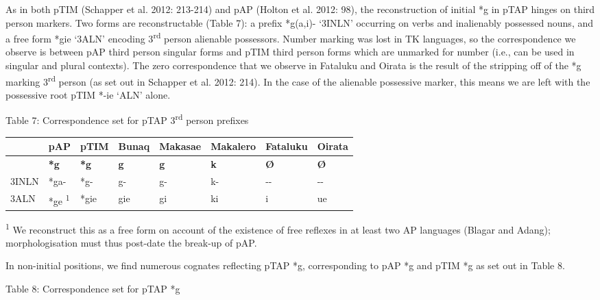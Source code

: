 \documentclass[a4paper]{article}
\begin{document}
As in both pTIM (Schapper et al. 2012: 213-214) and pAP (Holton et al. 2012: 98), the reconstruction of initial *g in pTAP hinges on third person markers. Two forms are reconstructable (Table 7): a prefix *g(a,i)- {\textquoteleft}3INLN{\textquoteright} occurring on verbs and inalienably possessed nouns, and a free form *gie {\textquoteleft}3ALN{\textquoteright} encoding 3\textsuperscript{rd} person alienable possessors. Number marking was lost in TK languages, so the correspondence we observe is between pAP third person singular forms and pTIM third person forms which are unmarked for number (i.e., can be used in singular and plural contexts). The zero correspondence that we observe in Fataluku and Oirata is the result of the stripping off of the *g marking 3\textsuperscript{rd} person (as set out in Schapper et al. 2012: 214). In the case of the alienable possessive marker, this means we are left with the possessive root pTIM *-ie {\textquoteleft}ALN{\textquoteright} alone.

{\centering
Table 7: Correspondence set for pTAP 3\textsuperscript{rd} person prefixes
\par}

\begin{center}
\tablehead{}
\begin{supertabular}{m{0.9406598in}m{0.6650598in}m{0.5170598in}m{0.6955598in}m{0.6962598in}m{0.6955598in}m{0.6962598in}m{0.6969598in}}
\hline
 &
pAP &
pTIM &
Bunaq &
Makasae &
Makalero &
Fataluku &
Oirata\\\hline
 &
\textbf{*g} &
\textbf{*g} &
\textbf{g} &
\textbf{g} &
\textbf{k} &
\textbf{{\O}} &
\textbf{{\O}}\\\hline
3INLN &
*ga- &
*g- &
g- &
g- &
k- &
{}-{}- &
{}-{}-\\
3ALN &
*ge \textsuperscript{1} &
*gie &
gie &
gi &
ki &
i &
ue\\\hline
\end{supertabular}
\end{center}
\textsuperscript{1} We reconstruct this as a free form on account of the existence of free reflexes in at least two AP languages (Blagar and Adang); morphologisation must thus post-date the break-up of pAP. 

In non-initial positions, we find numerous cognates reflecting pTAP *g, corresponding to pAP *g and pTIM *g as set out in Table 8. 

{\centering
Table 8: Correspondence set for pTAP *g
\par}
\end{document}
